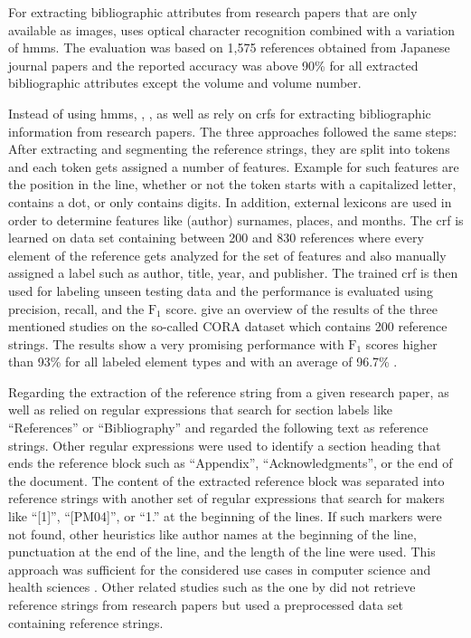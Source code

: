 For extracting bibliographic attributes from research papers that are only available as images, \citet{takasu2003bibliographic} uses optical character recognition combined with a variation of \glspl{hmm}.
The evaluation was based on 1,575 references obtained from Japanese journal papers and the reported accuracy was above 90\% for all extracted bibliographic attributes except the volume and volume number.

Instead of using \glspl{hmm}, \citet{peng2004accurate}, \citet{councill2008parscit}, as well as \citet{groza2012reference} rely on \glspl{crf} for extracting bibliographic information from research papers.
The three approaches followed the same steps:
After extracting and segmenting the reference strings, they are split into tokens and each token gets assigned a number of features.
Example for such features are the position in the line, whether or not the token starts with a capitalized letter, contains a dot, or only contains digits.
In addition, external lexicons are used in order to determine features like (author) surnames, places, and months.
The \gls{crf} is learned on data set containing between 200 and 830 references where every element of the reference gets analyzed for the set of features and also manually assigned a label such as author, title, year, and publisher.
The trained \gls{crf} is then used for labeling unseen testing data and the performance is evaluated using precision, recall, and the $\text{F}_1$ score.
\citet{groza2012reference} give an overview of the results of the three mentioned studies on the so-called CORA dataset which contains 200 reference strings.
The results show a very promising performance with $\text{F}_1$ scores higher than 93\% for all labeled element types and with an average of 96.7\% \citep{groza2012reference}.

Regarding the extraction of the reference string from a given research paper, \citet{councill2008parscit} as well as \citet{groza2012reference} relied on regular expressions that search for section labels like ``References'' or ``Bibliography'' and regarded the following text as reference strings.
Other regular expressions were used to identify a section heading that ends the reference  block such as ``Appendix'', ``Acknowledgments'', or the end of the document.
The content of the extracted reference block was separated into reference strings with another set of regular expressions that search for makers like ``[1]'', ``[PM04]'', or ``1.'' at the beginning of the lines.
If such markers were not found, other heuristics like author names at the beginning of the line, punctuation at the end of the line, and the length of the line were used.
This approach was sufficient for the considered use cases in computer science and health sciences \citep{councill2008parscit,groza2012reference}.
Other related studies such as the one by \citet{peng2004accurate} did not retrieve reference strings from research papers but used a preprocessed data set containing reference strings.\\


